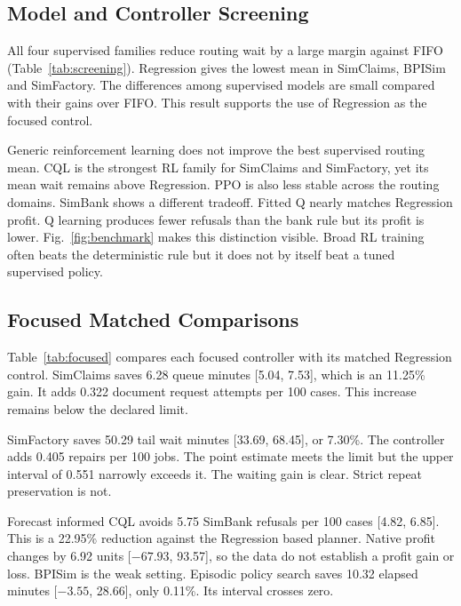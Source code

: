 \documentclass[conference]{IEEEtran}
\begin{document}


\subsection{Model and Controller Screening}

All four supervised families reduce routing wait by a large margin against FIFO (Table~\ref{tab:screening}). Regression gives the lowest mean in SimClaims, BPISim and SimFactory. The differences among supervised models are small compared with their gains over FIFO. This result supports the use of Regression as the focused control.

Generic reinforcement learning does not improve the best supervised routing mean. CQL is the strongest RL family for SimClaims and SimFactory, yet its mean wait remains above Regression. PPO is also less stable across the routing domains. SimBank shows a different tradeoff. Fitted Q nearly matches Regression profit. Q learning produces fewer refusals than the bank rule but its profit is lower. Fig.~\ref{fig:benchmark} makes this distinction visible. Broad RL training often beats the deterministic rule but it does not by itself beat a tuned supervised policy.



\subsection{Focused Matched Comparisons}

Table~\ref{tab:focused} compares each focused controller with its matched Regression control. SimClaims saves 6.28 queue minutes [5.04, 7.53], which is an 11.25\% gain. It adds 0.322 document request attempts per 100 cases. This increase remains below the declared limit.

SimFactory saves 50.29 tail wait minutes [33.69, 68.45], or 7.30\%. The controller adds 0.405 repairs per 100 jobs. The point estimate meets the limit but the upper interval of 0.551 narrowly exceeds it. The waiting gain is clear. Strict repeat preservation is not.

Forecast informed CQL avoids 5.75 SimBank refusals per 100 cases [4.82, 6.85]. This is a 22.95\% reduction against the Regression based planner. Native profit changes by 6.92 units [$-67.93$, 93.57], so the data do not establish a profit gain or loss. BPISim is the weak setting. Episodic policy search saves 10.32 elapsed minutes [$-3.55$, 28.66], only 0.11\%. Its interval crosses zero.
\end{document}
